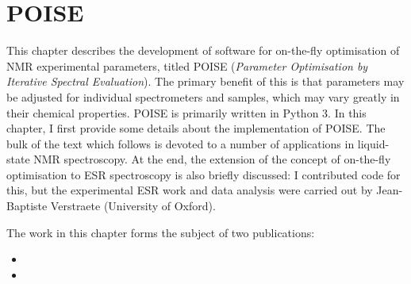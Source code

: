 \chapter{POISE}
\label{chpt:poise}

This chapter describes the development of software for on-the-fly optimisation of NMR experimental parameters, titled POISE (\textit{Parameter Optimisation by Iterative Spectral Evaluation}).
The primary benefit of this is that parameters may be adjusted for individual spectrometers and samples, which may vary greatly in their chemical properties.
POISE is primarily written in Python 3.
In this chapter, I first provide some details about the implementation of POISE.
The bulk of the text which follows is devoted to a number of applications in liquid-state NMR spectroscopy.
At the end, the extension of the concept of on-the-fly optimisation to ESR spectroscopy is also briefly discussed: I contributed code for this, but the experimental ESR work and data analysis were carried out by Jean-Baptiste Verstraete (University of Oxford).

The work in this chapter forms the subject of two publications:

\begin{itemize}
    \item {}
    \item {}
\end{itemize}

\clearpage







\printbibliography[heading=subbibnumbered]{}
